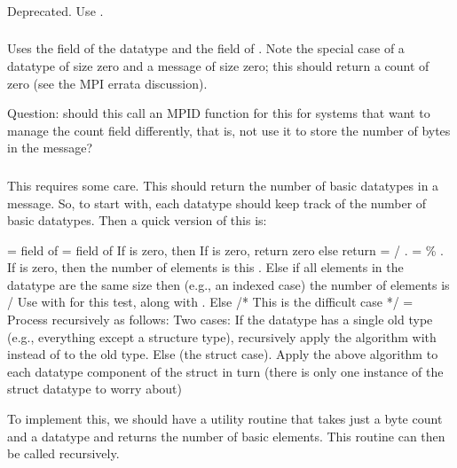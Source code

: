 \documentclass{article}
\begin{document}
\subsubsection{}
Deprecated.  Use .

\subsubsection{}
Uses the  field of the datatype 
and the
 field of .  
Note the
special case of a 
datatype of size zero and a message of size zero; this should return a count
of zero (see the MPI errata discussion). 

Question: should this call an MPID function for this for systems that want to
manage the count field differently, that is, not use it to store the number of
bytes in the message?  

\subsubsection{}
This requires some care.  This should return the number of basic datatypes in
a message.  So, to start with, each datatype should keep track of the number
of basic datatypes.  Then a quick version of this is:
\begin{algorithm}
 =  field of 
         =  field of 
If  is zero, then
    If  is zero, return zero
    else return 
 =  / .  
   =  \% .
If  is zero, then 
    the number of elements is this 
    . 
Else if all elements in the datatype are the same size then
    (e.g., an indexed case)
    the number of elements is  /
    Use  with
     for this test, along
    with .
Else 
    /* This is the difficult case */
     = 
    Process  recursively as follows:
    Two cases:
    If the datatype has a single old type (e.g., everything except 
    a structure type), recursively apply the algorithm with  
    instead of  to the old type.
    Else 
       (the struct case).
       Apply the above algorithm to each datatype component of the
       struct in turn (there is only one instance of the struct
       datatype to worry about)
\end{algorithm}
To implement this, we should have a utility routine
 that takes just a byte count and a
datatype and returns the number of basic elements.  This routine can
then be called recursively.
\end{document}
